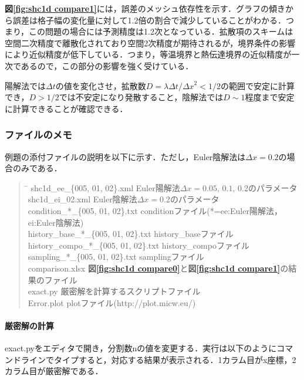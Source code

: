 \textbf{図\ref{fig:shc1d compare1}}には，誤差のメッシュ依存性を示す．グラフの傾きから誤差は格子幅の変化量に対して1.2倍の割合で減少していることがわかる．つまり，この問題の場合には予測精度は1.2次となっている．拡散項のスキームは空間二次精度で離散化されており空間2次精度が期待されるが，境界条件の影響により近似精度が低下している．つまり，等温境界と熱伝達境界の近似精度が一次であるので，この部分の影響を強く受けている．

陽解法では$\Delta t$の値を変化させ，拡散数$D=\lambda \Delta t \slash {\Delta x}^2<1\slash 2$の範囲で安定に計算でき，$D>1\slash 2$では不安定になり発散すること，陰解法では$D\sim 1$程度まで安定に計算できることが確認できる．

%
\pagebreak
\subsubsection{ファイルのメモ}

例題の添付ファイルの説明を以下に示す．ただし，Euler陰解法は$\Delta x=0.2$の場合のみである．

\begin{quote}
\begin{tabbing}
\hspace{18em}\= \hspace{20em}\kill
shc1d\_ee\_\{005, 01, 02\}.xml \> Euler陽解法$\Delta x=0.05,\,0.1,\,0.2$のパラメータ\\
shc1d\_ei\_02.xml \> Euler陰解法$\Delta x=0.2$のパラメータ\\
condition\_*\_\{005, 01, 02\}.txt \> conditionファイル(*=ee:Euler陽解法，ei:Euler陰解法)\\
history\_base\_*\_\{005, 01, 02\}.txt \> history\_baseファイル\\
history\_compo\_*\_\{005, 01, 02\}.txt \> history\_compoファイル\\
sampling\_*\_\{005, 01, 02\}.txt \> samplingファイル\\
comparison.xlsx \> \textbf{図\ref{fig:shc1d compare0}}と\textbf{図\ref{fig:shc1d compare1}}の結果のファイル\\
exact.py \> 厳密解を計算するスクリプトファイル\\
Error.plot \> plotファイル(http://plot.micw.eu/)\\
\end{tabbing}
\end{quote}

\paragraph{厳密解の計算}
exact.pyをエディタで開き，分割数nの値を変更する．実行は以下のようにコマンドラインでタイプすると，対応する結果が表示される．1カラム目がx座標，2カラム目が厳密解である．
{ \small
{}
}

